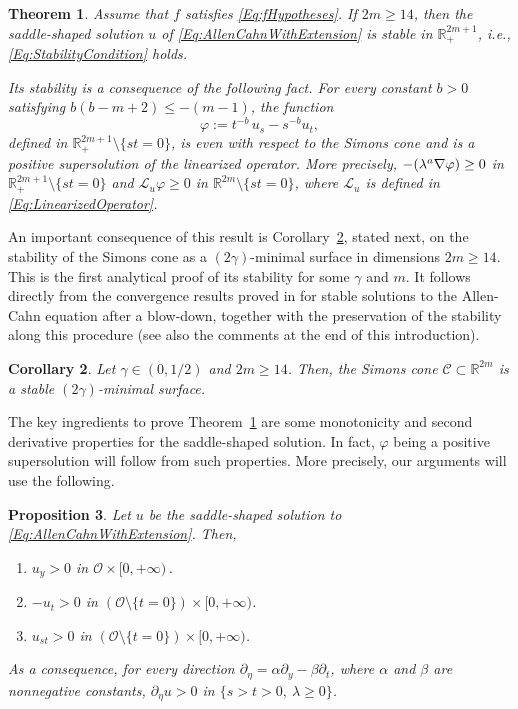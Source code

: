 \documentclass[12pt,reqno]{amsart}
\newtheorem{theorem}{Theorem}[section]
\newtheorem{proposition}[theorem]{Proposition}
\newtheorem{corollary}[theorem]{Corollary}
\theoremstyle{definition}
\theoremstyle{remark}
\newcommand{\con}[1]{\mathbb{#1}}
\newcommand{\R}{\con{R}} %
\newcommand{\ccal}{\mathscr{C}}
\newcommand{\ocal}{\mathcal{O}}
\newcommand{\s}{\gamma}
\let\div\relax
\DeclareMathOperator{\div}{div}
\numberwithin{equation}{section}
\begin{document}
\begin{theorem}
\label{Thm:Stability}
Assume that $f$ satisfies \eqref{Eq:fHypotheses}. If $2m\geq 14$, then the saddle-shaped solution $u$ of \eqref{Eq:AllenCahnWithExtension} is stable in $\R^{2m+1}_+$, i.e., \eqref{Eq:StabilityCondition} holds. 

Its stability is a consequence of the following fact. For every constant $b>0$ satisfying $b(b-m+2)\leq -(m-1)$, the function
$$
\varphi := t^{-b} \, u_s - s^{-b} u_t, 
$$
defined in $\R^{2m+1}_+\setminus\{st=0\}$, is even with respect to the Simons cone and is a positive supersolution of the linearized operator. More precisely, $-\div(\lambda^a \nabla \varphi) \geq 0$ in $\R^{2m+1}_+\setminus\{st=0\}$ and $\mathscr{L}_u \varphi \geq 0$ in $\R^{2m}\setminus\{st=0\}$, where $\mathscr{L}_u$ is defined in \eqref{Eq:LinearizedOperator}.
\end{theorem}

An important consequence of this result is Corollary~\ref{Cor:SimonsConeStableDim14}, stated next, on the stability of the Simons cone as a $(2\s)$-minimal surface in dimensions $2m\geq 14$. This is the first analytical proof of its stability for some $\s$ and $m$. It follows directly from the convergence results proved in \cite{CabreCintiSerra-Stable} for stable solutions to the Allen-Cahn equation after a blow-down, together with the preservation of the stability along this procedure (see also the comments at the end of this introduction).

\begin{corollary}
\label{Cor:SimonsConeStableDim14}
Let $\s \in (0,1/2)$ and $2m\geq 14$. Then, the Simons cone $\ccal \subset \R^{2m}$ is a stable $(2\s)$-minimal surface.
\end{corollary}


The key ingredients to prove Theorem~\ref{Thm:Stability} are some monotonicity and second derivative properties for the saddle-shaped solution. In fact, $\varphi$ being a positive supersolution will follow from such properties. More precisely, our arguments will use the following.

\begin{proposition}
\label{Prop:MonotonicityProperties}
Let $u$ be the saddle-shaped solution to \eqref{Eq:AllenCahnWithExtension}. Then,
\begin{enumerate}[label=(\roman{*})]
\item $u_y > 0$ in $\ocal \times [0, +\infty)$\,.
\item $-u_t > 0$ in $(\ocal \setminus \{ t= 0\}) \times [0,+\infty)$.
\item $u_{st} > 0$ in $(\ocal\setminus \{ t = 0\})\times [0,+\infty)$.
\end{enumerate}
As a consequence, for every direction $\partial_\eta = \alpha \partial_y - \beta \partial_t$, where $\alpha$ and $\beta$ are nonnegative constants, $\partial_\eta u > 0$ in $ \{s > t > 0,\ \lambda \geq 0\}$.
\end{proposition}
\end{document}
